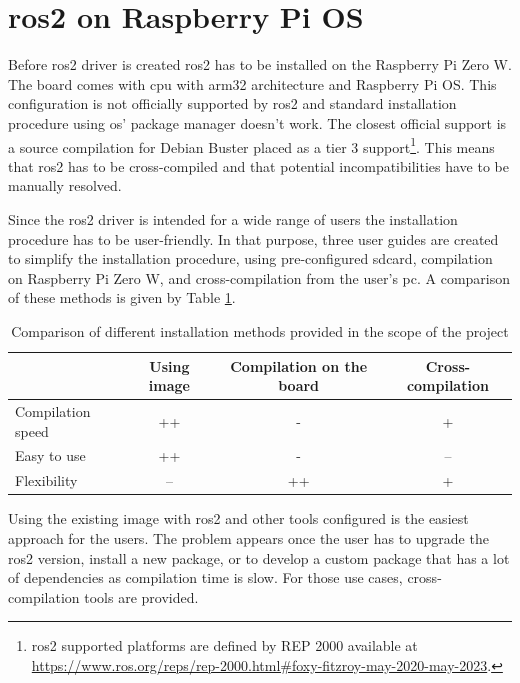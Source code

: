 \section{\ac{ros2} on Raspberry Pi OS}
Before \ac{ros2} driver is created \ac{ros2} has to be installed on the Raspberry Pi Zero W.
The board comes with \ac{cpu} with arm32 architecture and Raspberry Pi OS.
This configuration is not officially supported by \ac{ros2} and standard installation procedure using \acs{os}' package manager doesn't work.
The closest official support is a source compilation for Debian Buster placed as a tier 3 support\footnote{\ac{ros2} supported platforms are defined by REP 2000 available at \url{https://www.ros.org/reps/rep-2000.html\#foxy-fitzroy-may-2020-may-2023}.}.
This means that \ac{ros2} has to be cross-compiled and that potential incompatibilities have to be manually resolved.

Since the \ac{ros2} driver is intended for a wide range of users the installation procedure has to be user-friendly.
In that purpose, three user guides are created to simplify the installation procedure, using pre-configured \ac{sdcard}, compilation on Raspberry Pi Zero W, and cross-compilation from the user's \ac{pc}.
A comparison of these methods is given by Table \ref{tab:physical:installation}.

\begin{table}[H]
    \begin{adjustwidth}{-1.5in}{-1.5in}
    \centering
    \begin{tabular}{|l|c|c|c|}
        \hline
        & \textbf{Using image} & \textbf{Compilation on the board} & \textbf{Cross-compilation} \\
        \hline
        Compilation speed & ++ & - & + \\
        \hline
        Easy to use & ++ & - & -- \\
        \hline
        Flexibility & -- & ++ & + \\
        \hline
    \end{tabular}
    \caption{Comparison of different installation methods provided in the scope of the project}
    \label{tab:physical:installation}
    \end{adjustwidth}
\end{table}

Using the existing image with \ac{ros2} and other tools configured is the easiest approach for the users.
The problem appears once the user has to upgrade the \ac{ros2} version, install a new package, or to develop a custom package that has a lot of dependencies as compilation time is slow.
For those use cases, cross-compilation tools are provided.

